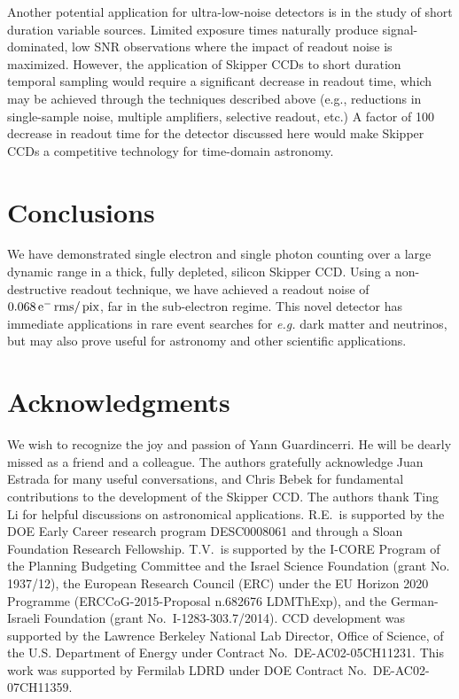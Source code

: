\documentclass[aps,prl,reprint,superscriptaddress,floatfix,nofootinbib,showkeys,showpacs,preprintnumbers]{revtex4-1}
\begin{document}
Another potential application for ultra-low-noise detectors is in the study of short duration variable sources.
Limited exposure times naturally produce signal-dominated, low SNR observations where the impact of readout noise is maximized.
However, the application of Skipper CCDs to short duration temporal sampling would require a significant decrease in readout time, which may be achieved through the techniques described above (e.g., reductions in single-sample noise, multiple amplifiers, selective readout, etc.) 
A factor of 100 decrease in readout time for the detector discussed here would make Skipper CCDs a competitive technology for time-domain astronomy. 


\section{Conclusions}
We have demonstrated single electron and single photon counting over a large dynamic range in a thick, fully depleted, silicon Skipper CCD.
Using a non-destructive readout technique, we have achieved a readout noise of $0.068 \mathrm{\,e^{-}} \mathrm{\,rms}/\mathrm{\,pix}$, far in the sub-electron regime.
This novel detector has immediate applications in rare event searches for {\emph{e.g.}} dark matter and neutrinos, but may also prove useful for astronomy and other scientific applications.

\section*{Acknowledgments}
We wish to recognize the joy and passion of Yann Guardincerri. 
He will be dearly missed as a friend and a colleague.
The authors gratefully acknowledge Juan Estrada for many useful conversations, and 
Chris Bebek for fundamental contributions to the development of the Skipper CCD.
The authors thank Ting Li for helpful discussions on astronomical applications.
R.E.\ is supported by the DOE Early Career research program DESC0008061 and through a Sloan Foundation Research Fellowship.
 T.V.\ is supported by the I-CORE Program of
the Planning Budgeting Committee and the Israel Science
Foundation (grant No. 1937/12), the European Research Council
(ERC) under the EU Horizon 2020 Programme (ERCCoG-2015-Proposal n.682676 LDMThExp), and the German-Israeli Foundation (grant No.\ I-1283-303.7/2014).
CCD development was supported by the Lawrence Berkeley National Lab Director, Office of Science, of the U.S. Department of Energy under
Contract No.\ DE-AC02-05CH11231. 
This work was supported by Fermilab LDRD under DOE Contract No.\ DE-AC02-07CH11359. 


\end{document}
